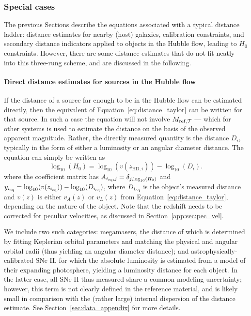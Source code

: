 \subsubsection {Special cases} \label{sec:eq_special}

The previous Sections describe the equations associated with a typical distance ladder: distance estimates for nearby (host) galaxies, calibration constraints, and secondary distance indicators applied to objects in the Hubble flow, leading to $ H_0 $ constraints.  However, there are some distance estimates that do not fit neatly into this three-rung scheme, and are discussed in the following.

\paragraph {Direct distance estimates for sources in the Hubble flow}

If the distance of a source far enough to be in the Hubble flow can be estimated directly, then the equivalent of Equation~\ref{eq:distance_taylor} can be written for that source. In such a case the equation will not involve $M_{\rm ref, \itype} $ --- which for other systems is used to estimate the distance on the basis of the observed apparent magnitude. Rather, the directly measured quantity is the distance $D_i$, typically in the form of either a luminosity or an angular diameter distance. The equation can simply be written as
\begin{equation}
  \log_{10}(H_0) = \log_{10}(v(z_{\mathrm{HD},i}))-\log_{10}(D_i).\label{eq:HF_direct}
\end{equation}
where the coefficient matrix has $A_{{i_{\rm eq}},j} = \delta_{j, \log_{10}(H_0)}$ and $y_{i_{\rm eq}} = \log_{10}(v(z_{i_{\rm eq}})) - \log_{10}(D_{i_{\rm eq}})$, where $D_{i_{\rm eq}}$ is the object's measured distance and $v(z)$ is either $v_A(z)$ or $v_L(z)$ from Equation~\ref{eq:distance_taylor}, depending on the nature of the object. Note that the redshift needs to be corrected for peculiar velocities, as discussed in Section~\ref{app:sec:pec_vel}.

We include two such categories: megamasers, the distance of which is determined by fitting Keplerian orbital parameters and matching the physical and angular orbital radii (thus yielding an angular diameter distance); and astrophysically-calibrated SNe II, for which the absolute luminosity is estimated from a model of their expanding photosphere, yielding a luminosity distance for each object. In the latter case, all SNe II thus measured share a common modeling uncertainty; however, this term is not clearly defined in the reference material, and is likely small in comparison with the (rather large) internal dispersion of the distance estimate. See Section~\ref{sec:data_appendix} for more details.

